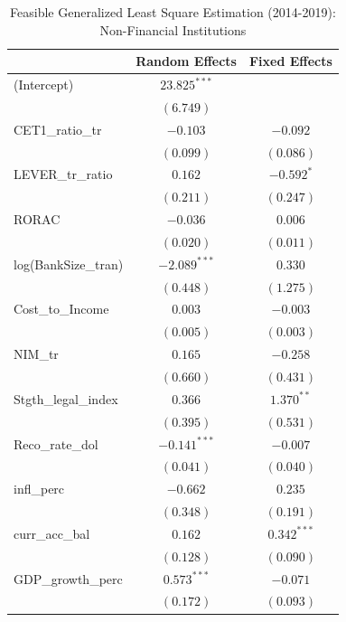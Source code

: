
\begin{table}
\caption{Feasible Generalized Least Square Estimation (2014-2019): Non-Financial Institutions}
\begin{center}
\begin{tabular}{l c c}
\hline
 & Random Effects & Fixed Effects \\
\hline
(Intercept)         & $23.825^{***}$ &               \\
                    & $(6.749)$      &               \\
CET1\_ratio\_tr     & $-0.103$       & $-0.092$      \\
                    & $(0.099)$      & $(0.086)$     \\
LEVER\_tr\_ratio    & $0.162$        & $-0.592^{*}$  \\
                    & $(0.211)$      & $(0.247)$     \\
RORAC               & $-0.036$       & $0.006$       \\
                    & $(0.020)$      & $(0.011)$     \\
log(BankSize\_tran) & $-2.089^{***}$ & $0.330$       \\
                    & $(0.448)$      & $(1.275)$     \\
Cost\_to\_Income    & $0.003$        & $-0.003$      \\
                    & $(0.005)$      & $(0.003)$     \\
NIM\_tr             & $0.165$        & $-0.258$      \\
                    & $(0.660)$      & $(0.431)$     \\
Stgth\_legal\_index & $0.366$        & $1.370^{**}$  \\
                    & $(0.395)$      & $(0.531)$     \\
Reco\_rate\_dol     & $-0.141^{***}$ & $-0.007$      \\
                    & $(0.041)$      & $(0.040)$     \\
infl\_perc          & $-0.662$       & $0.235$       \\
                    & $(0.348)$      & $(0.191)$     \\
curr\_acc\_bal      & $0.162$        & $0.342^{***}$ \\
                    & $(0.128)$      & $(0.090)$     \\
GDP\_growth\_perc   & $0.573^{***}$  & $-0.071$      \\
                    & $(0.172)$      & $(0.093)$     \\

\end{tabular}
\end{center}
\end{table}
